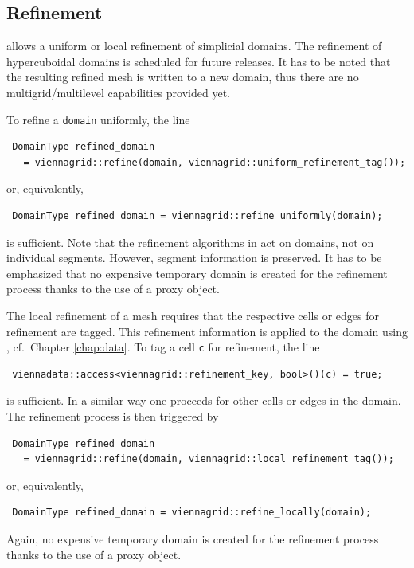  \subsection{Refinement}
 {\ViennaGridversion} allows a uniform or local refinement of simplicial domains. The refinement of hypercuboidal domains is scheduled for future releases.
It has to be noted that the resulting refined mesh is written to a new domain, thus there are no multigrid/multilevel capabilities provided yet.

 To refine a \lstinline|domain| uniformly, the line
 \begin{lstlisting}
 DomainType refined_domain
   = viennagrid::refine(domain, viennagrid::uniform_refinement_tag());
 \end{lstlisting}
 or, equivalently,
 \begin{lstlisting}
 DomainType refined_domain = viennagrid::refine_uniformly(domain);
 \end{lstlisting}
 is sufficient. Note that the refinement algorithms in {\ViennaGrid} act on domains, not on individual segments. However, segment information is preserved.
 It has to be emphasized that no expensive temporary domain is created for the refinement process thanks to the use of a proxy object.

 The local refinement of a mesh requires that the respective cells or edges for refinement are tagged. This refinement information is applied to the domain using {\ViennaData}, cf.~Chapter \ref{chap:data}.
 To tag a cell \lstinline|c| for refinement, the line
 \begin{lstlisting}
 viennadata::access<viennagrid::refinement_key, bool>()(c) = true;
 \end{lstlisting}
 is sufficient. In a similar way one proceeds for other cells or edges in the domain. The refinement process is then triggered by
 \begin{lstlisting}
 DomainType refined_domain 
   = viennagrid::refine(domain, viennagrid::local_refinement_tag());
 \end{lstlisting}
 or, equivalently,
 \begin{lstlisting}
 DomainType refined_domain = viennagrid::refine_locally(domain);
 \end{lstlisting}
 Again, no expensive temporary domain is created for the refinement process thanks to the use of a proxy object.


